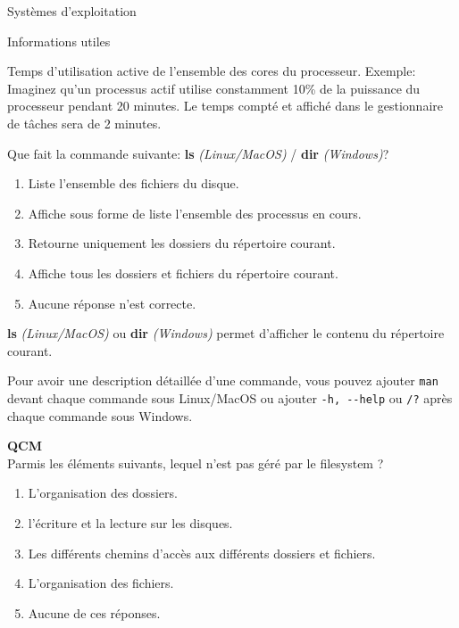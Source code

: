\begin{section}{Systèmes d'exploitation}
\begin{Exercice}[5 minutes]
\begin{Example}{\faLightbulb \quad Informations utiles}
        \end{Example}
        \begin{solution}
            Temps d'utilisation active de l'ensemble des cores du processeur.
            Exemple: Imaginez qu'un processus actif utilise constamment 10\% de la puissance du processeur pendant 20 minutes. Le temps compté et affiché dans le gestionnaire de tâches sera de 2 minutes.
        \end{solution}
    \end{Exercice}

    \begin{Exercice}[5 minutes]
        Que fait la commande suivante: \textbf{ls} \textit{(Linux/MacOS)} / \textbf{dir} \textit{(Windows)}?
        \begin{enumerate}
            \item Liste l'ensemble des fichiers du disque.
            \item Affiche sous forme de liste l'ensemble des processus en cours.
            \item Retourne uniquement les dossiers du répertoire courant.
            \item Affiche tous les dossiers et fichiers du répertoire courant.
            \item Aucune réponse n'est correcte.
        \end{enumerate}
        \begin{solution}
            \textbf{ls} \textit{(Linux/MacOS)} ou \textbf{dir} \textit{(Windows)} permet d'afficher le contenu du répertoire courant.
        \end{solution}
        \begin{conseil}
            Pour avoir une description détaillée d'une commande, vous pouvez ajouter \lstinline{man} devant chaque commande sous Linux/MacOS ou ajouter \lstinline{-h, --help} ou \lstinline{/?} après chaque commande sous Windows.
        \end{conseil}
    \end{Exercice}
    
     \begin{Exercice}[5 minutes]  \textbf{QCM}\\
    Parmis les éléments suivants, lequel n'est pas géré par le filesystem ?
        \begin{enumerate}
            \item L'organisation des dossiers.
            \item l'écriture et la lecture sur les disques.
            \item Les différents chemins d'accès aux différents dossiers et fichiers.
            \item L'organisation des fichiers.
            \item Aucune de ces réponses.
        \end{enumerate}
    \end{Exercice}
    

\end{section}

